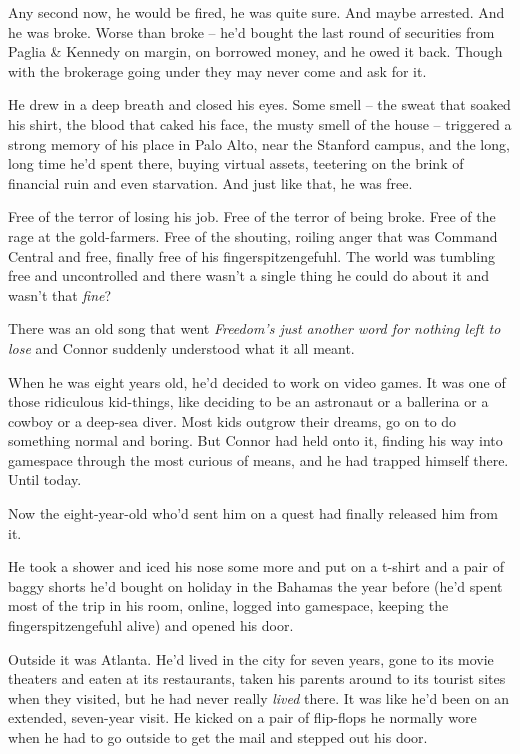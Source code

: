 Any second now, he would be fired, he was quite sure. And maybe
arrested. And he was broke. Worse than broke -- he'd bought the
last round of securities from Paglia \& Kennedy on margin, on
borrowed money, and he owed it back. Though with the brokerage
going under they may never come and ask for it.

He drew in a deep breath and closed his eyes. Some smell -- the
sweat that soaked his shirt, the blood that caked his face, the
musty smell of the house -- triggered a strong memory of his place
in Palo Alto, near the Stanford campus, and the long, long time
he'd spent there, buying virtual assets, teetering on the brink of
financial ruin and even starvation. And just like that, he was
free.

Free of the terror of losing his job. Free of the terror of being
broke. Free of the rage at the gold-farmers. Free of the shouting,
roiling anger that was Command Central and free, finally free of
his fingerspitzengefuhl. The world was tumbling free and
uncontrolled and there wasn't a single thing he could do about it
and wasn't that \emph{fine}?

There was an old song that went
\emph{Freedom's just another word for nothing left to lose} and
Connor suddenly understood what it all meant.

When he was eight years old, he'd decided to work on video games.
It was one of those ridiculous kid-things, like deciding to be an
astronaut or a ballerina or a cowboy or a deep-sea diver. Most kids
outgrow their dreams, go on to do something normal and boring. But
Connor had held onto it, finding his way into gamespace through the
most curious of means, and he had trapped himself there. Until
today.

Now the eight-year-old who'd sent him on a quest had finally
released him from it.

He took a shower and iced his nose some more and put on a t-shirt
and a pair of baggy shorts he'd bought on holiday in the Bahamas
the year before (he'd spent most of the trip in his room, online,
logged into gamespace, keeping the fingerspitzengefuhl alive) and
opened his door.

Outside it was Atlanta. He'd lived in the city for seven years,
gone to its movie theaters and eaten at its restaurants, taken his
parents around to its tourist sites when they visited, but he had
never really \emph{lived} there. It was like he'd been on an
extended, seven-year visit. He kicked on a pair of flip-flops he
normally wore when he had to go outside to get the mail and stepped
out his door.

